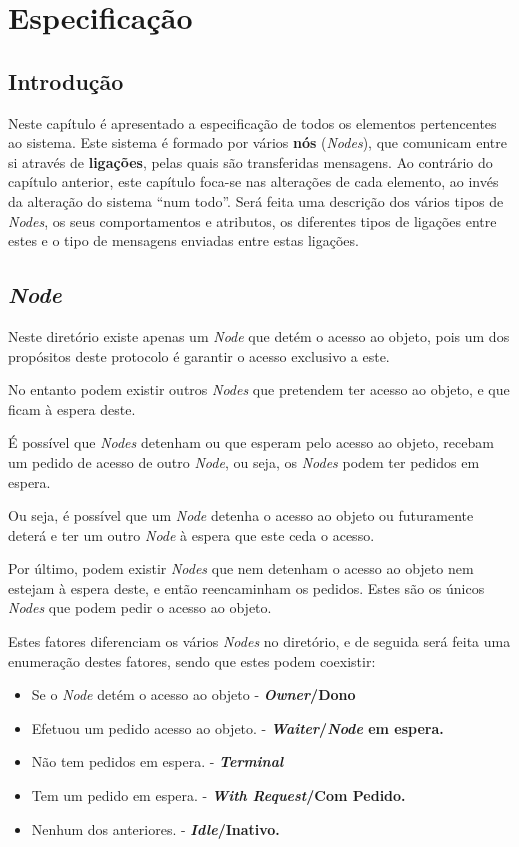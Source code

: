 \chapter{Especificação}
\label{chap:especificacao}

\section{Introdução}
\label{especificacao:sec:intro}
Neste capítulo é apresentado a especificação de todos os elementos pertencentes ao sistema. Este sistema é formado por vários \textbf{nós} (\emph{Nodes}), que comunicam entre si através de \textbf{ligações}, pelas quais são transferidas mensagens. 
Ao contrário do capítulo anterior, este capítulo foca-se nas alterações de cada elemento, ao invés da alteração do sistema ``num todo''.
Será feita uma descrição dos vários tipos de \emph{Nodes}, os seus comportamentos e atributos, os diferentes tipos de ligações entre estes e o tipo de mensagens enviadas entre estas ligações.



\section{\emph{Node}}

Neste diretório existe apenas um \emph{Node} que detém o acesso ao objeto, pois um dos propósitos deste protocolo é garantir o acesso exclusivo a este. 


No entanto podem existir outros \emph{Nodes} que pretendem ter acesso ao objeto, e que ficam à espera deste. 

É possível que \emph{Nodes} detenham ou que esperam pelo acesso ao objeto, recebam um pedido de acesso de outro \emph{Node}, ou seja, os \emph{Nodes} podem ter pedidos em espera.

Ou seja, é possível que um \emph{Node} detenha o acesso ao objeto ou futuramente deterá e ter um outro \emph{Node} à espera que este ceda o acesso.

Por último, podem existir \emph{Nodes} que nem detenham o acesso ao objeto nem estejam à espera deste, e então reencaminham os pedidos. Estes são os únicos \emph{Nodes} que podem pedir o acesso ao objeto.

Estes fatores diferenciam os vários \emph{Nodes} no diretório,
e de seguida será feita uma enumeração destes fatores, sendo que estes podem coexistir:

\begin{itemize}
    \item Se o \emph{Node} detém o acesso ao objeto - \textbf{\emph{Owner}/Dono}
    \item Efetuou um pedido acesso ao objeto. - \textbf{\emph{Waiter}/\emph{Node} em espera. }

    \item Não tem pedidos em espera. - \textbf{\emph{Terminal}}
    \item Tem um pedido em espera. - \textbf{\emph{With Request}/Com Pedido.}

    \item Nenhum dos anteriores. - \textbf{\emph{Idle}/Inativo.}
\end{itemize}


